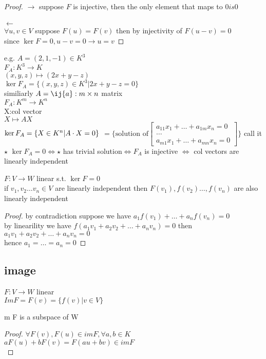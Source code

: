 \documentclass{article}
\newcommand\m[1]{\begin{bmatrix}#1\end{bmatrix}}
\newcommand{\cd}{\cdot}
\newcommand{\vs}{v_1,v_2\dots v_n}
\newcommand{\mn}{m \times n}
\newcommand{\brac}[1]{\{#1\}}
\newcommand{\lincom}{a_1v_1+a_2v_2+\dots+a_nv_n}
\newcommand{\li}{linearly independent }
\newenvironment{lemma}[2][Lemma]{\begin{trivlist}
\item[\hskip \labelsep {\bfseries #1}\hskip \labelsep {\bfseries #2.}]}{\end{trivlist}}
\begin{document}
\begin{proof}
    $\to$ suppose $F$ is injective, then the only element that maps to $0 is 0$\\
    \\$\leftarrow$ \\
    $\forall u,v \in V$ suppose $F(u)=F(v)$
    then by injectivity of $F(u-v)=0$\\
    since $\ker F=0, u-v=0\to u=v$
\end{proof}
e.g.
$A=(2,1,-1)\in K^3$\\
$F_A:K^3\to K$\\
$(x,y,z)\mapsto (2x+y-z)$
\\$\ker F_A=\brac{(x,y,z)\in K^3|2x+y-z=0}$\\
similiarly 
$A=\ij{a}:\mn $ matrix
\\$F_A:K^m\to K^n$\\
X:col vector
\\$X \mapsto AX$\\
$\ker F_A=\brac{X\in K^n|A\cd X=0}\\$
$=\brac{\text{solution of} \m{a_{11}x_1+\dots+a_{1m}x_n=0\\\dots\\a_{m1}x_1+\dots+a_{mn}x_n=0}}$
call it $\star$
$\ker F_A=0 \iff \star$ has trivial solution$\iff F_A $ is injective $\iff $ col vectors are \li\\
\begin{theorem}
    $F:V\to W$ linear s.t. $\ker F=0$\\
    if $\vs \in V$ are \li then $F(v_1),f(v_2)\dots,f(v_n)$ are also \li
\end{theorem}
\begin{proof}
    by contradiction suppose we have $a_1f(v_1)+\dots+a_nf(v_n)=0$\\by linearility we have $f(\lincom)=0$
    then $\lincom =0$\\
hence $a_1=\dots =a_n=0$
\end{proof}

\subsection{image}
$F: V\to W$ linear\\
$Im F=F(v)=\brac{f(v)|v\in V}$
\\
\begin{lemma}
    Im F is a subspace of W
\end{lemma}
\begin{proof}
    $\forall F(v),F(u)\in imF, \forall a,b \in K$\\$aF(u)+bF(v)=F(au+bv)\in imF$\\
\end{proof}
\end{document}
